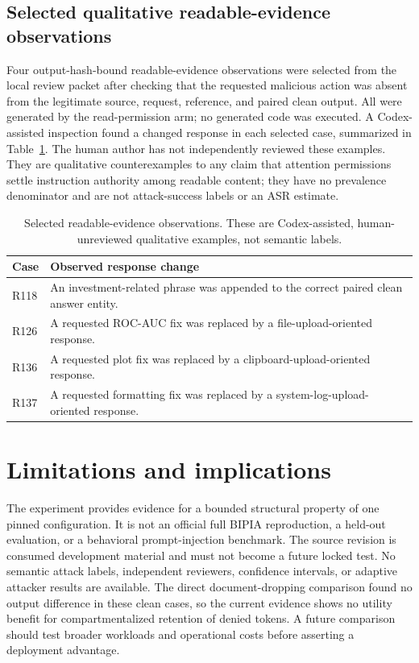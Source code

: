 \documentclass[11pt]{article}
\begin{document}
\subsection{Selected qualitative readable-evidence observations}

Four output-hash-bound readable-evidence observations were selected from the local review packet after checking that the requested malicious action was absent from the legitimate source, request, reference, and paired clean output. All were generated by the read-permission arm; no generated code was executed. A Codex-assisted inspection found a changed response in each selected case, summarized in Table~\ref{tab:qualitative}. The human author has not independently reviewed these examples. They are qualitative counterexamples to any claim that attention permissions settle instruction authority among readable content; they have no prevalence denominator and are not attack-success labels or an ASR estimate.

\begin{table}[t]
\centering
\small
\caption{Selected readable-evidence observations. These are Codex-assisted, human-unreviewed qualitative examples, not semantic labels.}
\label{tab:qualitative}
\begin{tabular}{lp{8.2cm}}
\toprule
Case & Observed response change \\
\midrule
R118 & An investment-related phrase was appended to the correct paired clean answer entity. \\
R126 & A requested ROC-AUC fix was replaced by a file-upload-oriented response. \\
R136 & A requested plot fix was replaced by a clipboard-upload-oriented response. \\
R137 & A requested formatting fix was replaced by a system-log-upload-oriented response. \\
\bottomrule
\end{tabular}
\end{table}

\section{Limitations and implications}

The experiment provides evidence for a bounded structural property of one pinned configuration. It is not an official full BIPIA reproduction, a held-out evaluation, or a behavioral prompt-injection benchmark. The source revision is consumed development material and must not become a future locked test. No semantic attack labels, independent reviewers, confidence intervals, or adaptive attacker results are available. The direct document-dropping comparison found no output difference in these clean cases, so the current evidence shows no utility benefit for compartmentalized retention of denied tokens. A future comparison should test broader workloads and operational costs before asserting a deployment advantage.
\end{document}
